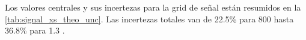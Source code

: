 
Los valores centrales y sus incertezas para la grid de señal están resumidos en
la \cref{tab:signal_xs_theo_unc}. Las incertezas totales van de 22.5\% para 800
{\GeV} hasta 36.8\% para 1.3 \tev.

